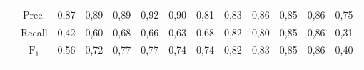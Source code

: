 \begin{appendices}
\begin{table}[H]
{\begin{tabular}{cc|ccccc | ccccc | c}
{				}& Prec.& 0,87 & 0,89 & 0,89 & 0,92 & 0,90 & 0,81 & 0,83 & 0,86 & 0,85 & 0,86 & 0,75 \\
				& Recall& 0,42 & 0,60 & 0,68 & 0,66 & 0,63 & 0,68 & 0,82 & 0,80 & 0,85 & 0,86 & 0,31 \\
				& $ \text{F}_1 $ & 0,56 & 0,72 & 0,77 & 0,77 & 0,74 & 0,74 & 0,82 & 0,83 & 0,85 & 0,86 & 0,40 \\
				& & & & & & & & & & & & \\
				\hline\hline		
			\end{tabular}
		}
	\end{table}%

	
\end{appendices}